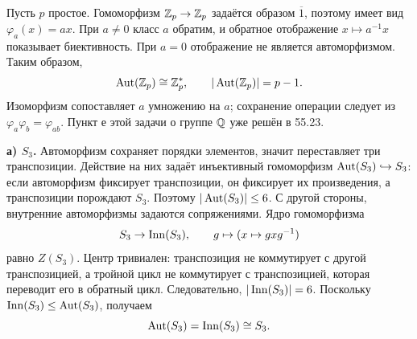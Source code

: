 

Пусть $p$ простое. Гомоморфизм $\mathbb{Z}_p\to\mathbb{Z}_p$ задаётся
образом $\overline1$, поэтому имеет вид $\varphi_a(x)=ax$.
При $a\ne0$ класс $a$ обратим, и обратное отображение
$x\mapsto a^{-1}x$ показывает биективность.
При $a=0$ отображение не является автоморфизмом.
Таким образом,
\[\operatorname{Aut}(\mathbb{Z}_p)\cong\mathbb{Z}_p^*,\qquad|\operatorname{Aut}(\mathbb{Z}_p)|=p-1.\]
Изоморфизм сопоставляет $a$ умножению на $a$;
сохранение операции следует из $\varphi_a\varphi_b=\varphi_{ab}$.
Пункт е этой задачи о группе $\mathbb{Q}$ уже решён в 55.23.

\textbf{а) $S_3$.}
Автоморфизм сохраняет порядки элементов, значит переставляет
три транспозиции. Действие на них задаёт инъективный
гомоморфизм $\operatorname{Aut}(S_3)\hookrightarrow S_3$:
если автоморфизм фиксирует транспозиции, он фиксирует их произведения,
а транспозиции порождают $S_3$. Поэтому $|\operatorname{Aut}(S_3)|\le6$.
С другой стороны, внутренние автоморфизмы задаются сопряжениями.
Ядро гомоморфизма
\[S_3\to\operatorname{Inn}(S_3),\qquad g\mapsto(x\mapsto gxg^{-1})\]
равно $Z(S_3)$. Центр тривиален:
транспозиция не коммутирует с другой транспозицией,
а тройной цикл не коммутирует с транспозицией,
которая переводит его в обратный цикл.
Следовательно, $|\operatorname{Inn}(S_3)|=6$.
Поскольку $\operatorname{Inn}(S_3)\le\operatorname{Aut}(S_3)$, получаем
\[\operatorname{Aut}(S_3)=\operatorname{Inn}(S_3)\cong S_3.\]

